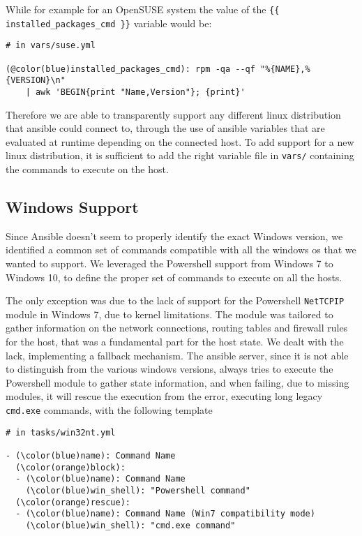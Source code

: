 \documentclass[11pt]{article}
\begin{document}
While for example for an OpenSUSE system the value of the {\tt \{\{ installed\_packages\_cmd \}\}} variable would be:

\begin{Verbatim}[commandchars=@\(\)]
# in vars/suse.yml

(@color(blue)installed_packages_cmd): rpm -qa --qf "%{NAME},%{VERSION}\n" 
    | awk 'BEGIN{print "Name,Version"}; {print}'
\end{Verbatim}

Therefore we are able to transparently support any different linux distribution that ansible could connect to, through the use of ansible variables that are evaluated at runtime depending on the connected host. To add support for a new linux distribution, it is sufficient to add the right variable file in {\tt vars/} containing the commands to execute on the host.

\subsection{Windows Support}

Since Ansible doesn't seem to properly identify the exact Windows version, we identified a common set of commands compatible with all the windows os that we wanted to support. We leveraged the Powershell support from Windows 7 to Windows 10, to define the proper set of commands to execute on all the hosts. 

The only exception was due to the lack of support for the Powershell {\tt NetTCPIP} module in Windows 7, due to kernel limitations. The module was tailored to gather information on the network connections, routing tables and firewall rules for the host, that was a fundamental part for the host state. We dealt with the lack, implementing a fallback mechanism. The ansible server, since it is not able to distinguish from the various windows versions, always tries to execute the Powershell module to gather state information, and when failing, due to missing modules, it will rescue the execution from the error, executing long legacy {\tt cmd.exe} commands, with the following template

\begin{Verbatim}[commandchars=\\\(\)]
# in tasks/win32nt.yml

- (\color(blue)name): Command Name
  (\color(orange)block):
  - (\color(blue)name): Command Name
    (\color(blue)win_shell): "Powershell command"
  (\color(orange)rescue):
  - (\color(blue)name): Command Name (Win7 compatibility mode)
    (\color(blue)win_shell): "cmd.exe command"
\end{Verbatim}
\end{document}
